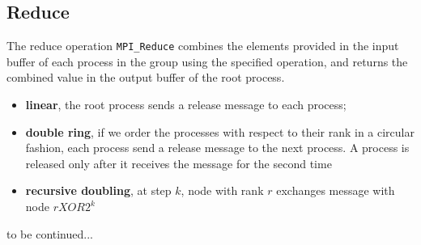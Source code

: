 \subsection{Reduce}

The reduce operation \texttt{MPI\_Reduce} combines the elements provided in the input buffer of each process in the group
using the specified operation, and returns the combined value in the output buffer of the root
process.

\begin{itemize}
\item \textbf{linear}, the root process sends a release message to each process;
\item \textbf{double ring}, if we order the processes with respect to their rank in a circular fashion, each process send a release message to the next process. A process is released only after it receives the message for the second time
\item \textbf{recursive doubling}, at step $k$, node with rank $r$ exchanges message with node $r XOR 2^k$
\end{itemize}
to be continued...
